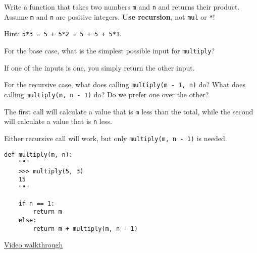 \question Write a function that takes two numbers {\tt m} and {\tt n} and
returns their product. Assume {\tt m} and {\tt n} are positive integers.
\textbf{Use recursion}, not \texttt{mul} or \texttt{*}!

Hint: \texttt{5*3 = 5 + 5*2 = 5 + 5 + 5*1}.

For the base case, what is the simplest possible input for \texttt{multiply}?
\begin{solution}[0.3in]
If one of the inputs is one, you simply return the other input.
\end{solution}

For the recursive case, what does calling \texttt{multiply(m - 1, n)} do?
What does calling \texttt{multiply(m, n - 1)} do?
Do we prefer one over the other?
\begin{solution}[0.5in]
The first call will calculate a value that is \texttt{m} less than the total,
while the second will calculate a value that is  \texttt{n} less.

Either recursive call will work, but only \texttt{multiply(m, n - 1)}  is
needed.
\end{solution}

\begin{blocksection}
\begin{lstlisting}
def multiply(m, n):
    """
    >>> multiply(5, 3)
    15
    """
\end{lstlisting}
\begin{solution}[1.25in]
\begin{lstlisting}
    if n == 1:
        return m
    else:
        return m + multiply(m, n - 1)
\end{lstlisting}
\href{https://youtu.be/VcZPTlE56G8?t=41m21s}{Video walkthrough}
\end{solution}
\end{blocksection}
